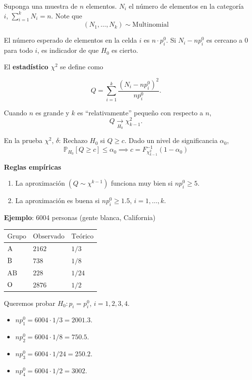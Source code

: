 \documentclass[
  12pt,
]{book}
\begin{document}
Suponga una muestra de \(n\) elementos. \(N_i\) el número de elementos en la categoría \(i\), \(\sum _{i=1}^kN_i = n\). Note que
\[(N_1,\dots,N_k)\sim\text{Multinomial}\]

El número esperado de elementos en la celda \(i\) es \(n\cdot p_i^0\). Si \(N_i -np_i^0\) es cercano a 0 para todo \(i\), es indicador de que \(H_0\) es cierto.

El \textbf{estadístico \(\chi^2\)} se define como

\[Q = \sum_{i=1}^k\dfrac{(N_i-np_i^0)^2}{np_i^0}.\]

Cuando \(n\) es grande y \(k\) es ``relativamente'' pequeño con respecto a \(n\),
\[Q \xrightarrow[H_0]{}\chi^2_{k-1}.\]

En la prueba \(\chi^2\), \(\delta\): Rechazo \(H_0\) si \(Q\geq c\). Dado un nivel de significancia \(\alpha_0\),
\[\mathbb P_{H_0}[Q\geq c]\le \alpha_0\implies c = F^{-1}_{\chi^2_{k-1}}(1-\alpha_0)\]

\textbf{Reglas empíricas}

\begin{enumerate}
\def\labelenumi{\arabic{enumi}.}
\item
  La aproximación \((Q\sim\chi^{k-1})\) funciona muy bien si \(np_i^0\ge 5\).
\item
  La aproximación es buena si \(np_i^0\ge 1.5\), \(i=1,\dots,k\).
\end{enumerate}

\textbf{Ejemplo}: 6004 personas (gente blanca, California)

\begin{longtable}[]{@{}lll@{}}
\toprule
\(\text{Grupo}\) & \(\text{Observado}\) & \(\text{Teórico}\)\tabularnewline
\midrule
\endhead
\(\text A\) & \(2162\) & \(1/3\)\tabularnewline
\(\text B\) & \(738\) & \(1/8\)\tabularnewline
\(\text {AB}\) & \(228\) & \(1/24\)\tabularnewline
\(\text O\) & \(2876\) & \(1/2\)\tabularnewline
\bottomrule
\end{longtable}

Queremos probar \(H_0: p_i = p_i^0\), \(i=1,2,3,4\).

\begin{itemize}
\item
  \(np_1^0 = 6004\cdot1/3 = 2001.3\).
\item
  \(np_2^0 = 6004\cdot1/8 = 750.5\).
\item
  \(np_3^0 = 6004\cdot1/24 = 250.2\).
\item
  \(np_4^0 = 6004\cdot1/2 = 3002\).
\end{itemize}
\end{document}
